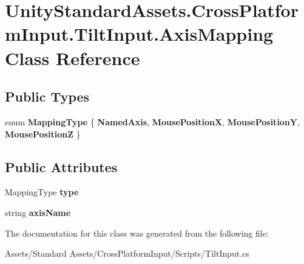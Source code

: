 \hypertarget{class_unity_standard_assets_1_1_cross_platform_input_1_1_tilt_input_1_1_axis_mapping}{}\section{Unity\+Standard\+Assets.\+Cross\+Platform\+Input.\+Tilt\+Input.\+Axis\+Mapping Class Reference}
\label{class_unity_standard_assets_1_1_cross_platform_input_1_1_tilt_input_1_1_axis_mapping}
\subsection*{Public Types}
\begin{DoxyCompactItemize}
\item 
enum {\bfseries Mapping\+Type} \{ {\bfseries Named\+Axis}, 
{\bfseries Mouse\+PositionX}, 
{\bfseries Mouse\+PositionY}, 
{\bfseries Mouse\+PositionZ}
 \}\hypertarget{class_unity_standard_assets_1_1_cross_platform_input_1_1_tilt_input_1_1_axis_mapping_a237892bdafa6578dcf66b355a470e58b}{}\label{class_unity_standard_assets_1_1_cross_platform_input_1_1_tilt_input_1_1_axis_mapping_a237892bdafa6578dcf66b355a470e58b}

\end{DoxyCompactItemize}
\subsection*{Public Attributes}
\begin{DoxyCompactItemize}
\item 
Mapping\+Type {\bfseries type}\hypertarget{class_unity_standard_assets_1_1_cross_platform_input_1_1_tilt_input_1_1_axis_mapping_aba5d982b878f8b4e15867b731782ed63}{}\label{class_unity_standard_assets_1_1_cross_platform_input_1_1_tilt_input_1_1_axis_mapping_aba5d982b878f8b4e15867b731782ed63}

\item 
string {\bfseries axis\+Name}\hypertarget{class_unity_standard_assets_1_1_cross_platform_input_1_1_tilt_input_1_1_axis_mapping_a75b32887fe2065f3c67cdda50b2b9c00}{}\label{class_unity_standard_assets_1_1_cross_platform_input_1_1_tilt_input_1_1_axis_mapping_a75b32887fe2065f3c67cdda50b2b9c00}

\end{DoxyCompactItemize}


The documentation for this class was generated from the following file\+:\begin{DoxyCompactItemize}
\item 
Assets/\+Standard Assets/\+Cross\+Platform\+Input/\+Scripts/Tilt\+Input.\+cs\end{DoxyCompactItemize}
